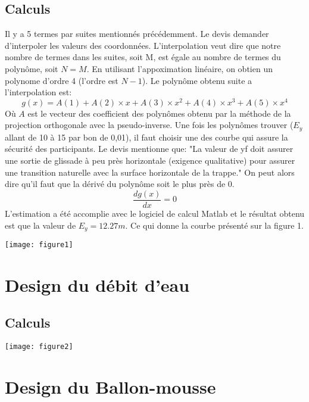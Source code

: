 \documentclass[12pt]{article}
\begin{document}
\subsection{Calculs}
Il y a 5 termes par suites mentionnés précédemment. Le devis demander d'interpoler les valeurs des coordonnées. L'interpolation veut dire que notre nombre de termes dans les suites, soit M, est égale au nombre de termes du polynôme, soit $N=M$. En utilisant l'appoximation linéaire, on obtien un polynome d'ordre 4 (l'ordre est $N-1$). Le polynôme obtenu suite a l'interpolation est: 
\begin{equation}
g(x) = A(1) + A(2)\times x + A(3)\times x^2 + A(4)\times x^3 + A(5)\times x^4 
\end{equation}
Où $A$ est le vecteur des coefficient des polynômes obtenu par la méthode de la projection orthogonale avec la pseudo-inverse. 
\newpage
\noindent
Une fois les polynômes trouver ($E_y$ allant de 10 à 15 par bon de 0,01), il faut choisir une des courbe qui assure la sécurité des participants. Le devis mentionne que: "La valeur de yf doit assurer une sortie de glissade à peu près horizontale (exigence qualitative) pour assurer une transition naturelle avec la surface horizontale de la trappe." On peut alors dire qu'il faut que la dérivé du polynôme soit le plus près de 0. 
\begin{equation}
\frac{dg(x)}{dx} = 0
\end{equation}
L'estimation a été accomplie avec le logiciel de calcul Matlab et le résultat obtenu est que la valeur de $E_y = 12.27m$. Ce qui donne la courbe présenté sur la figure 1.

\begin{center}
	\texttt{[image: figure1]}
\end{center}


\section{Design du débit d'eau}
\subsection{Calculs}

\begin{center}
	\texttt{[image: figure2]}
\end{center}


\section{Design du Ballon-mousse}
\end{document}
